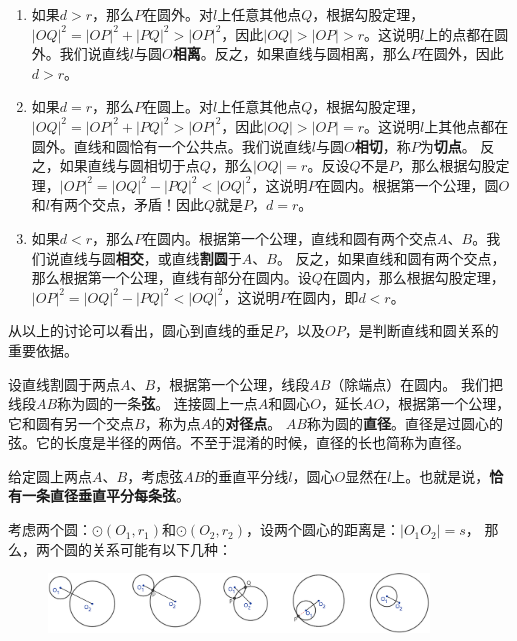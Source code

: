 \documentclass[12pt,UTF8]{ctexbook}
\begin{document}
\begin{enumerate}
    \item 如果$d > r$，那么$P$在圆外。对$l$上任意其他点$Q$，根据勾股定理，$|OQ|^2 = |OP|^2 + |PQ|^2 > |OP|^2$，因此$|OQ| > |OP| > r$。这说明$l$上的点都在圆外。我们说直线$l$与圆$O$\textbf{相离}。反之，如果直线与圆相离，那么$P$在圆外，因此$d > r$。
    \item 如果$d = r$，那么$P$在圆上。对$l$上任意其他点$Q$，根据勾股定理，$|OQ|^2 = |OP|^2 + |PQ|^2 > |OP|^2$，因此$|OQ| > |OP| = r$。这说明$l$上其他点都在圆外。直线和圆恰有一个公共点。我们说直线$l$与圆$O$\textbf{相切}，称$P$为\textbf{切点}。
    反之，如果直线与圆相切于点$Q$，那么$|OQ| = r$。反设$Q$不是$P$，那么根据勾股定理，$|OP|^2 = |OQ|^2 - |PQ|^2 < |OQ|^2$，这说明$P$在圆内。根据第一个公理，圆$O$和$l$有两个交点，矛盾！因此$Q$就是$P$，$d = r$。
    \item 如果$d < r$，那么$P$在圆内。根据第一个公理，直线和圆有两个交点$A$、$B$。我们说直线与圆\textbf{相交}，或直线\textbf{割圆}于$A$、$B$。
    反之，如果直线和圆有两个交点，那么根据第一个公理，直线有部分在圆内。设$Q$在圆内，那么根据勾股定理，$|OP|^2 = |OQ|^2 - |PQ|^2 < |OQ|^2$，这说明$P$在圆内，即$d < r$。
\end{enumerate}
从以上的讨论可以看出，圆心到直线的垂足$P$，以及$OP$，是判断直线和圆关系的重要依据。

设直线割圆于两点$A$、$B$，根据第一个公理，线段$AB$（除端点）在圆内。
我们把线段$AB$称为圆的一条\textbf{弦}。
连接圆上一点$A$和圆心$O$，延长$AO$，根据第一个公理，它和圆有另一个交点$B$，称为点$A$的\textbf{对径点}。
$AB$称为圆的\textbf{直径}。直径是过圆心的弦。它的长度是半径的两倍。不至于混淆的时候，直径的长也简称为直径。

给定圆上两点$A$、$B$，考虑弦$AB$的垂直平分线$l$，圆心$O$显然在$l$上。也就是说，\textbf{恰有一条直径垂直平分每条弦}。

考虑两个圆：$\odot(O_1, r_1)$和$\odot(O_2, r_2)$，设两个圆心的距离是：$|O_1O_2| = s$，
那么，两个圆的关系可能有以下几种：

\begin{figure}[h] %
    \vspace{8pt}
    \centering
    \includegraphics[width=0.9\textwidth]{圆与圆1.png}
\end{figure}
\end{document}
